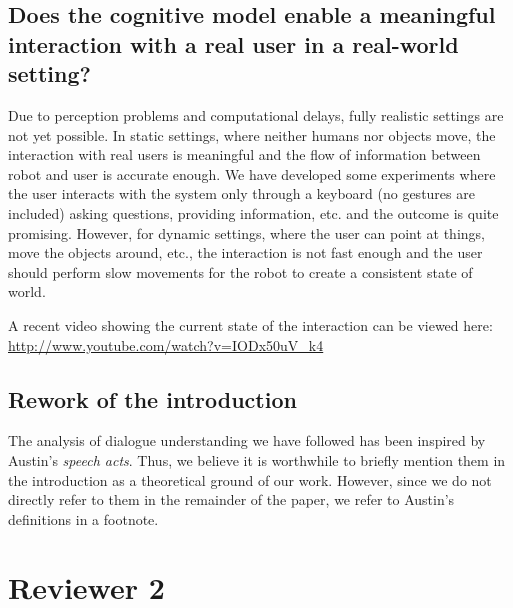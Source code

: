 \documentclass[11pt]{article}
\begin{document}
\subsection{Does the cognitive model enable a meaningful interaction with a
real user in a real-world setting?}

Due to perception problems and computational delays, fully realistic settings
are not yet possible. In static settings, where neither humans nor objects
move, the interaction with real users is meaningful and the flow of information
between robot and user is accurate enough.  We have developed some experiments
where the user interacts with the system only through a keyboard (no gestures
are included) asking questions, providing information, etc. and the outcome is
quite promising. However, for dynamic settings, where the user can point at
things, move the objects around, etc., the interaction is not fast enough and
the user should perform slow movements for the robot to create a consistent
state of world.

A recent video showing the current state of the interaction can be viewed
here: \url{http://www.youtube.com/watch?v=IODx50uV_k4}

\subsection{Rework of the introduction} 


The analysis of dialogue understanding we have followed has been inspired by
Austin's \emph{speech acts}. Thus, we believe it is worthwhile to briefly mention
them in the introduction as a theoretical ground of our work. However, since we do not directly refer to them in the remainder of the paper,
we refer to Austin's definitions in a footnote.

\section{Reviewer 2}
\end{document}
